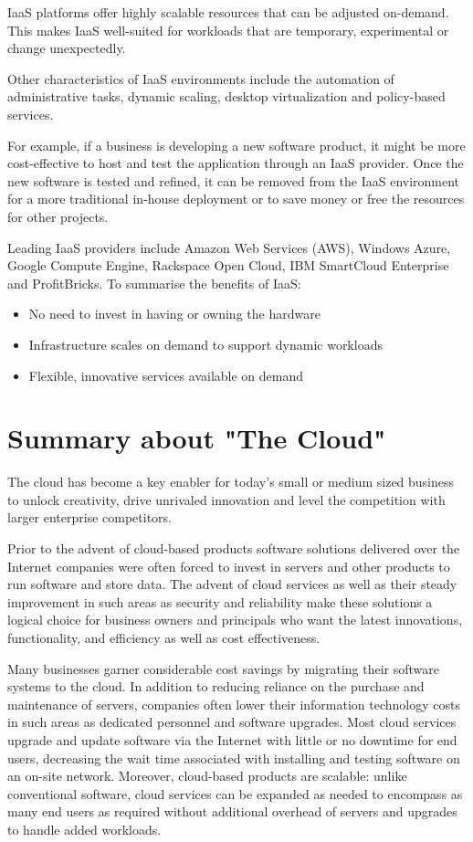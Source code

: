IaaS platforms offer highly scalable resources that can be adjusted on-demand. This makes IaaS well-suited for workloads that are temporary, experimental or change unexpectedly.

Other characteristics of IaaS environments include the automation of administrative tasks, dynamic scaling, desktop virtualization and policy-based services.

For example, if a business is developing a new software product, it might be more cost-effective to host and test the application through an IaaS provider. Once the new software is tested and refined, it can be removed from the IaaS environment for a more traditional in-house deployment or to save money or free the resources for other projects.

Leading IaaS providers include Amazon Web Services (AWS), Windows Azure, Google Compute Engine, Rackspace Open Cloud, IBM SmartCloud Enterprise and ProfitBricks.
To summarise the benefits of IaaS:
\begin{itemize}
	\item No need to invest in having or owning the hardware
	\item Infrastructure scales on demand to support dynamic workloads
	\item Flexible, innovative services available on demand
\end{itemize}

\section{Summary about "The Cloud"}\label{sec:intro1_summary}
The cloud has become a key enabler for today's small or medium sized business to unlock creativity, drive unrivaled innovation and level the competition with larger enterprise competitors.

Prior to the advent of cloud-based products software solutions delivered over the Internet companies were often forced to invest in servers and other products to run software and store data. The advent of cloud services as well as their steady improvement in such areas as security and reliability make these solutions a logical choice for business owners and principals who want the latest innovations, functionality, and efficiency as well as cost effectiveness.

Many businesses garner considerable cost savings by migrating their software systems to the cloud. In addition to reducing reliance on the purchase and maintenance of servers, companies often lower their information technology costs in such areas as dedicated personnel and software upgrades. Most cloud services upgrade and update software via the Internet with little or no downtime for end users, decreasing the wait time associated with installing and testing software on an on-site network. Moreover, cloud-based products are scalable: unlike conventional software, cloud services can be expanded as needed to encompass as many end users as required without additional overhead of servers and upgrades to handle added workloads.

